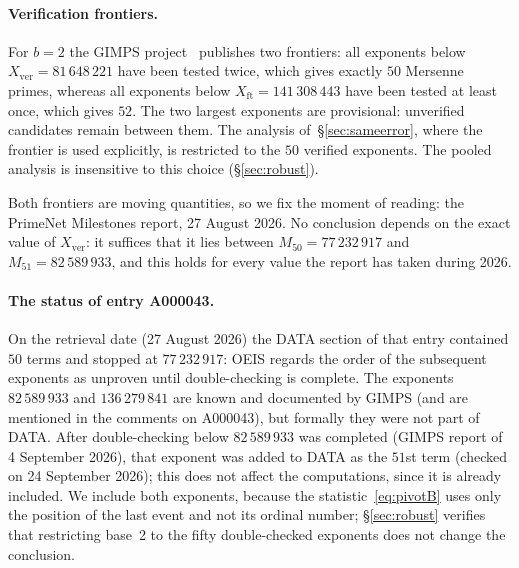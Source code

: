 \documentclass[11pt,a4paper]{article}
\theoremstyle{plain}
\theoremstyle{remark}
\begin{document}
\paragraph{Verification frontiers.} For $b=2$ the GIMPS project~\cite{gimps}
publishes two frontiers: all exponents below $X_{\mathrm{ver}}=81\,648\,221$
have been tested twice, which gives exactly $50$ Mersenne primes, whereas all
exponents below $X_{\mathrm{ft}}=141\,308\,443$ have been tested at least once,
which gives $52$. The two largest exponents are provisional: unverified
candidates remain between them. The analysis of~\S\ref{sec:sameerror}, where the
frontier is used explicitly, is restricted to the $50$ verified exponents. The
pooled analysis is insensitive to this choice (\S\ref{sec:robust}).

Both frontiers are moving quantities, so we fix the moment of reading: the
PrimeNet Milestones report, 27 August 2026. No conclusion depends on the exact
value of $X_{\mathrm{ver}}$: it suffices that it lies between
$M_{50}=77\,232\,917$ and $M_{51}=82\,589\,933$, and this holds for every value
the report has taken during 2026.

\paragraph{The status of entry A000043.} On the retrieval date (27 August 2026)
the DATA section of that entry contained $50$ terms and stopped at
$77\,232\,917$: OEIS regards the order of the subsequent exponents as unproven
until double-checking is complete. The exponents $82\,589\,933$ and
$136\,279\,841$ are known and documented by GIMPS (and are mentioned in the
comments on A000043), but formally they were not part of DATA. After
double-checking below $82\,589\,933$ was completed (GIMPS report of 4 September
2026), that exponent was added to DATA as the $51$st term (checked on
24 September 2026); this does not affect the computations, since it is already
included. We include both
exponents, because the statistic~\eqref{eq:pivotB} uses only the position
of the last event and not its ordinal number; \S\ref{sec:robust} verifies that
restricting base~2 to the fifty double-checked exponents does not change the
conclusion.
\end{document}
